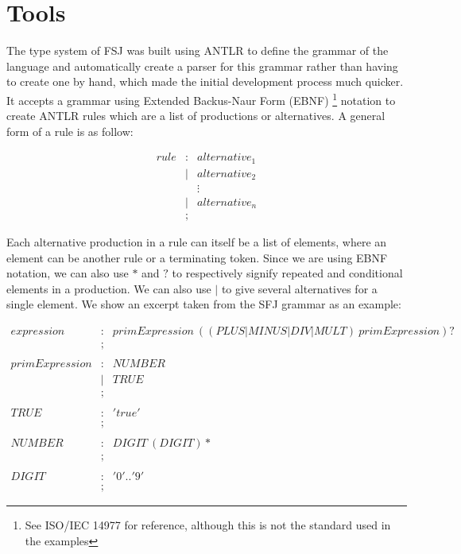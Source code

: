 \documentclass{l4proj}
\begin{document}
\section{Tools}

The type system of FSJ was built using ANTLR \citep{parr2013} to define the grammar of the language and automatically create a parser for this grammar rather than having to create one by hand, which made the initial development process much quicker.
It accepts a grammar using Extended Backus-Naur Form (EBNF) \footnote{See ISO/IEC 14977 for reference, although this is not the standard used in the examples} notation to create ANTLR rules which are a list of productions or alternatives.
A general form of a rule is as follow:

\begin{equation}
    \begin{array}{llll}
        rule & : & alternative_{1}
        \\
             & | & alternative_{2}
        \\
             &   & \vdots
        \\
             & | & alternative_{n}
        \\
             & ; &
    \end{array}
\end{equation}

Each alternative production in a rule can itself be a list of elements, where an element can be another rule or a terminating token.
Since we are using EBNF notation, we can also use $*$ and $?$ to respectively signify repeated and conditional elements in a production.
We can also use $|$ to give several alternatives for a single element.
We show an excerpt taken from the SFJ grammar as an example:

\begin{equation}
    \begin{array}{llll}
        expression     & : & primExpression\ ( (PLUS | MINUS | DIV | MULT)\ primExpression)?
        \\
                       & ;
        \\
        \\
        primExpression & : & NUMBER
        \\
                       & | & TRUE
        \\
                       & ; &
        \\
        \\
        TRUE           & : & 'true'
        \\
                       & ; &
        \\
        \\
        NUMBER         & : & DIGIT\ (DIGIT)*
        \\
                       & ; &
        \\
        \\
        DIGIT          & : & '0'..'9'
        \\
                       & ; &
    \end{array}
\end{equation}
\end{document}
